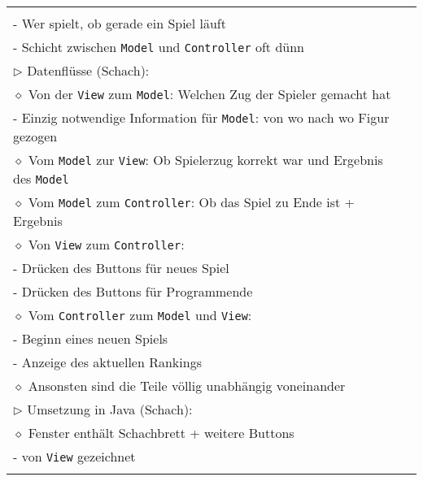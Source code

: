 \begin{longtable}{ | p{} p{} | }
{	\hspace{0.4cm} $\diamond$ \texttt{Controller}: \\
	\hspace{0.6cm} - Wer spielt, ob gerade ein Spiel läuft \\
	\hspace{0.6cm} - Schicht zwischen \texttt{Model} und \texttt{Controller} oft dünn \\
	$\triangleright$ Datenflüsse (Schach): \\
	\hspace{0.4cm} $\diamond$ Von der \texttt{View} zum \texttt{Model}: Welchen Zug der Spieler gemacht hat \\
	\hspace{0.6cm} - Einzig notwendige Information für \texttt{Model}: von wo nach wo Figur gezogen \\
	\hspace{0.4cm} $\diamond$ Vom \texttt{Model} zur \texttt{View}: Ob Spielerzug korrekt war und Ergebnis des \texttt{Model} \\
	\hspace{0.4cm} $\diamond$ Vom \texttt{Model} zum \texttt{Controller}: Ob das Spiel zu Ende ist + Ergebnis \\
	\hspace{0.4cm} $\diamond$ Von \texttt{View} zum \texttt{Controller}: \\
	\hspace{0.6cm} - Drücken des Buttons für neues Spiel \\
	\hspace{0.6cm} - Drücken des Buttons für Programmende \\
	\hspace{0.4cm} $\diamond$ Vom \texttt{Controller} zum \texttt{Model} und \texttt{View}: \\
	\hspace{0.6cm} - Beginn eines neuen Spiels \\
	\hspace{0.6cm} - Anzeige des aktuellen Rankings \\
	\hspace{0.4cm} $\diamond$ Ansonsten sind die Teile völlig unabhängig voneinander \\
	$\triangleright$ Umsetzung in Java (Schach): \\ 
	\hspace{0.4cm} $\diamond$ Fenster enthält Schachbrett + weitere Buttons \\
	\hspace{0.6cm} - von \texttt{View} gezeichnet \\
}
\end{longtable}

